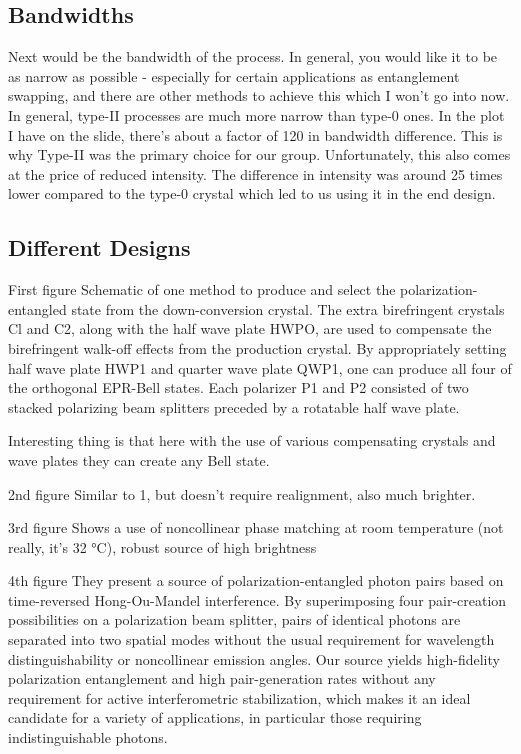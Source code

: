 \documentclass{article}
\theoremstyle{mytheoremstyle}
\theoremstyle{mytheoremstyle}
\theoremstyle{myproblemstyle}
\begin{document}
\subsection{Bandwidths}
Next would be the bandwidth of the process. In general, you would like it to be as narrow as possible - especially for certain
applications as entanglement swapping, and there are other methods to achieve this which I won't go into now. In general,
type-II processes are much more narrow than type-0 ones. In the plot I have on the slide, there's about a factor of 120 in 
bandwidth difference. This is why Type-II was the primary choice for our group. Unfortunately, this also comes at the price 
of reduced intensity. The difference in intensity was around 25 times lower compared to the type-0 crystal which led to us
using it in the end design.

\subsection{Different Designs}
First figure
Schematic of one method to produce and select the polarization-entangled state from the down-conversion crystal.
The extra birefringent crystals Cl and C2, along with the half wave plate HWPO, are used to compensate the birefringent
walk-off effects from the production crystal. By appropriately setting half wave plate HWP1 and quarter wave plate QWP1,
one can produce all four of the orthogonal EPR-Bell states. Each polarizer P1 and P2 consisted of two stacked polarizing
beam splitters preceded by a rotatable half wave plate.

Interesting thing is that here with the use of various compensating crystals and wave plates they can create any
Bell state.

2nd figure
Similar to 1, but doesn't require realignment, also much brighter.

3rd figure
Shows a use of noncollinear phase matching at room temperature (not really,
it's 32 °C), robust source of high brightness

4th figure
They present a source of polarization-entangled photon pairs based on time-reversed
Hong-Ou-Mandel interference. By superimposing four pair-creation possibilities on a polarization beam
splitter, pairs of identical photons are separated into two spatial modes without the usual requirement for
wavelength distinguishability or noncollinear emission angles. Our source yields high-fidelity polarization entanglement and high pair-generation rates without any requirement for active interferometric
stabilization, which makes it an ideal candidate for a variety of applications, in particular those requiring
indistinguishable photons.
\end{document}
